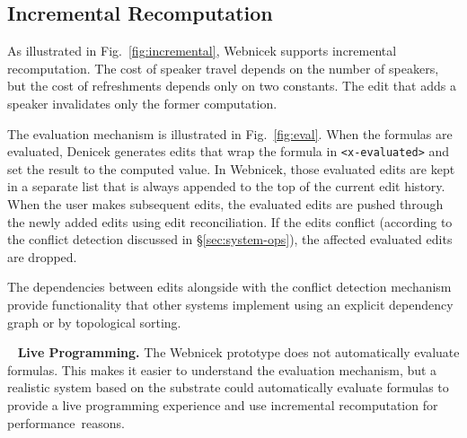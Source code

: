 \documentclass[sigconf,anonymous,screen]{acmart}
\newcommand{\note}[1]{\textcolor{red}{#1}}
\DeclareRobustCommand{\keyideabox}[3]{\begin{tcolorbox}[breakable,
  boxsep=5pt,left=0pt,right=0pt,top=0pt,bottom=0pt,width=\dimexpr\columnwidth\relax,
  colback=gray!20,colframe=gray!20,
  enlarge bottom by=0pt,enlarge top by=0pt,
  arc=0pt,outer arc=0pt]
\lettrine[lraise=0.3]{\LARGE #1}{~}
\small \textbf{#2.} #3
\end{tcolorbox}
}
\begin{document}

\subsection{Incremental Recomputation}
\label{sec:impl-incremental}

As illustrated in Fig.~\ref{fig:incremental}, Webnicek supports incremental recomputation.
The cost of speaker travel depends on the number of speakers, but the cost of refreshments
depends only on two constants. The edit that adds a speaker invalidates only the former computation.

The evaluation mechanism is illustrated in Fig.~\ref{fig:eval}. When the formulas are evaluated,
Denicek generates edits that wrap the formula in {\small\Verb_<x-evaluated>_} and set the result
to the computed value. In Webnicek, those evaluated edits are kept in a separate list that is always
appended to the top of the current edit history. When the user makes subsequent edits, the evaluated
edits are pushed through the newly added edits using edit reconciliation. If the edits conflict
(according to the conflict detection discussed in \S\ref{sec:system-ops}), the affected evaluated
edits are dropped.

The dependencies between edits alongside with the conflict detection mechanism provide functionality
that other systems implement using an explicit dependency graph or by topological sorting.

\keyideabox{\faRefresh}{Live Programming}{The Webnicek prototype does not automatically
evaluate formulas. This makes it easier to understand the evaluation
mechanism, but a realistic system based on the substrate could automatically evaluate
formulas to provide a live programming experience \cite{petricek-2020-live,rein-2019-live}
and use incremental recomputation for performance~reasons.}


%
\end{document}
